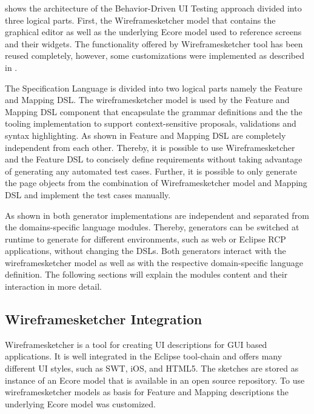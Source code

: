 \documentclass{sig-alternate-05-2015}
\begin{document}
 shows the architecture of the Behavior-Driven UI Testing approach divided into three logical parts. 
First, the Wireframesketcher model that contains the graphical editor as well as the underlying Ecore model used to reference screens and their widgets.
The functionality offered by Wireframesketcher tool has been reused completely, however, some customizations were implemented as described in .

The Specification Language is divided into two logical parts namely the Feature and Mapping DSL.
The wireframesketcher model is used by the Feature and Mapping DSL component that encapsulate the grammar definitions and the the tooling implementation to support context-sensitive proposals, validations and syntax highlighting.
As shown in  Feature and Mapping DSL are completely independent from each other.
Thereby, it is possible to use Wireframesketcher and the Feature DSL to concisely define requirements without taking advantage of generating any automated test cases.
Further, it is possible to only generate the page objects from the combination of Wireframesketcher model and Mapping DSL and implement the test cases manually.

As shown in  both generator implementations are independent and separated from the domains-specific language modules.
Thereby, generators can be switched at runtime to generate for different environments, such as web or Eclipse RCP applications, without changing the DSLs.
Both generators interact with the wireframesketcher model as well as with the respective domain-specific language definition.
The following sections will explain the modules content and their interaction in more detail.

\subsection{Wireframesketcher Integration}\label{sec:WireframesketcherIntegration} 
Wireframesketcher is a tool for creating UI descriptions for GUI based applications. 
It is well integrated in the Eclipse tool-chain and offers many different UI styles, such as SWT, iOS, and HTML5.
The sketches are stored as instance of an Ecore model that is available in an open source repository.
To use wireframesketcher models as basis for Feature and Mapping descriptions the underlying Ecore model was customized.
\end{document}
